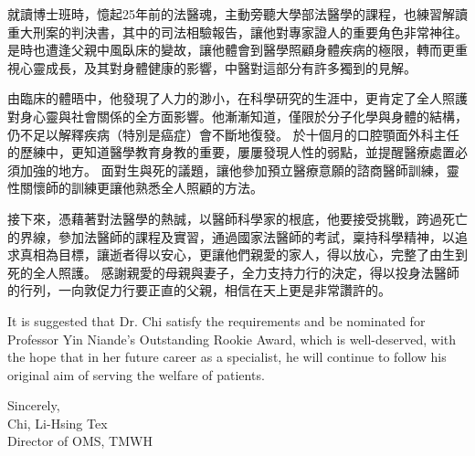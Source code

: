 \documentclass{letter}
\begin{document}
\begin{letter}

就讀博士班時，憶起25年前的法醫魂，主動旁聽大學部法醫學的課程，也練習解讀重大刑案的判決書，其中的司法相驗報告，讓他對專家證人的重要角色非常神往。
是時也遭逢父親中風臥床的變故，讓他體會到醫學照顧身體疾病的極限，轉而更重視心靈成長，及其對身體健康的影響，中醫對這部分有許多獨到的見解。

由臨床的體晤中，他發現了人力的渺小，在科學研究的生涯中，更肯定了全人照護對身心靈與社會關係的全方面影響。他漸漸知道，僅限於分子化學與身體的結構，仍不足以解釋疾病（特別是癌症）會不斷地復發。
於十個月的口腔顎面外科主任的歷練中，更知道醫學教育身教的重要，屢屢發現人性的弱點，並提醒醫療處置必須加強的地方。 %
面對生與死的議題，讓他參加預立醫療意願的諮商醫師訓練，靈性關懷師的訓練更讓他熟悉全人照顧的方法。

接下來，憑藉著對法醫學的熱誠，以醫師科學家的根底，他要接受挑戰，跨過死亡的界線，參加法醫師的課程及實習，通過國家法醫師的考試，稟持科學精神，以追求真相為目標，讓逝者得以安心，更讓他們親愛的家人，得以放心，完整了由生到死的全人照護。
感謝親愛的母親與妻子，全力支持力行的決定，得以投身法醫師的行列，一向敦促力行要正直的父親，相信在天上更是非常讚許的。


It is suggested that Dr. Chi satisfy the requirements and be nominated for Professor Yin Niande's Outstanding Rookie Award, which is well-deserved, with the hope that in her future career as a specialist, he will continue to follow his original aim of serving the welfare of patients.

\medskip
Sincerely, \\
Chi, Li-Hsing Tex \\
Director of OMS, TMWH

\clearpage

%


\end{letter}
\end{document}
